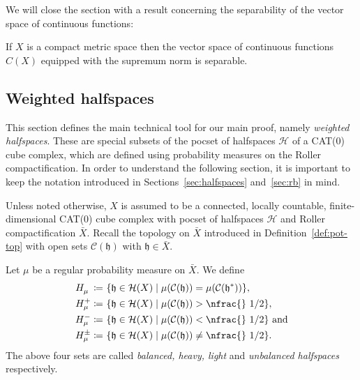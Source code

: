 We will close the section with a result concerning the separability of the vector space of continuous functions:

\begin{lemma}
  \label{lem:continuous-separable}
  If \(X\) is a compact metric space then the vector space of continuous functions \(C(X)\) equipped with the supremum norm is separable.
\end{lemma}

\subsection{Weighted halfspaces}
\label{sec:weight}

This section defines the main technical tool for our main proof, namely \emph{weighted halfspaces}. These are special subsets of the pocset of halfspaces \(\mathcal{H}\) of a CAT(0) cube complex, which are defined using probability measures on the Roller compactification. In order to understand the following section, it is important to keep the notation introduced in Sections~\ref{sec:halfspaces} and~\ref{sec:rb} in mind.

Unless noted otherwise, \(X\) is assumed to be a connected, locally countable, finite-dimensio\-nal CAT(0) cube complex with pocset of halfspaces \(\mathcal{H}\) and Roller compactification \(\bar X\). Recall the topology on \(\bar X\) introduced in Definition~\ref{def:pot-top} with open sets \(\mathcal{C}(\mathfrak{h})\) with \(\mathfrak{h} \in \bar X\).

\begin{defin}
  \label{defin:weight}
  Let \(\mu\) be a regular probability measure on \(\bar X\). We define
  \begin{align*}
    H_\mu^{\phantom{+}} \coloneqq &\ \{\mathfrak{h} \in \mathcal{H}(X) \mid \mu(\mathcal{C}(\mathfrak{h})) = \mu(\mathcal{C}(\mathfrak{h}^\ast))\},\\
    H_\mu^+ \coloneqq &\ \{\mathfrak{h} \in \mathcal{H}(X) \mid \mu(\mathcal{C}(\mathfrak{h})) > \text{\nfrac{} 1/2} \},\\
    H_\mu^- \coloneqq &\ \{\mathfrak{h} \in \mathcal{H}(X) \mid \mu(\mathcal{C}(\mathfrak{h})) < \text{\nfrac{} 1/2}\} \text{ and}\\
    H_\mu^\pm \coloneqq &\ \{\mathfrak{h} \in \mathcal{H}(X) \mid \mu(\mathcal{C}(\mathfrak{h})) \neq \text{\nfrac{} 1/2}\}.
  \end{align*} 
  The above four sets are called \emph{balanced, heavy, light} and \emph{unbalanced halfspaces} respectively.
\end{defin}

